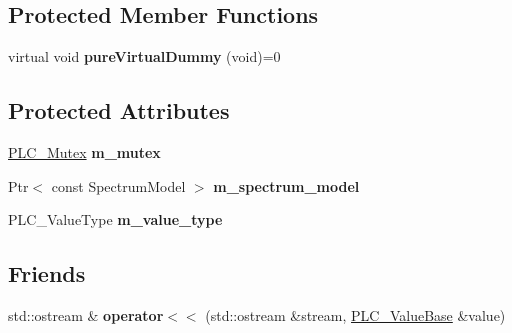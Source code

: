 \subsection*{\-Protected \-Member \-Functions}
\begin{DoxyCompactItemize}
\item 
\hypertarget{classns3_1_1PLC__ValueBase_ad4b3aa179236b9ef183f1b8b4ccf57d6}{virtual void {\bfseries pure\-Virtual\-Dummy} (void)=0}\label{classns3_1_1PLC__ValueBase_ad4b3aa179236b9ef183f1b8b4ccf57d6}

\end{DoxyCompactItemize}
\subsection*{\-Protected \-Attributes}
\begin{DoxyCompactItemize}
\item 
\hypertarget{classns3_1_1PLC__ValueBase_ada5e05a8498a3bf69e682404a15bfedb}{\hyperlink{structns3_1_1PLC__Mutex}{\-P\-L\-C\-\_\-\-Mutex} {\bfseries m\-\_\-mutex}}\label{classns3_1_1PLC__ValueBase_ada5e05a8498a3bf69e682404a15bfedb}

\item 
\hypertarget{classns3_1_1PLC__ValueBase_a3da12fe42a52936f4f72a1c635824ddd}{\-Ptr$<$ const \-Spectrum\-Model $>$ {\bfseries m\-\_\-spectrum\-\_\-model}}\label{classns3_1_1PLC__ValueBase_a3da12fe42a52936f4f72a1c635824ddd}

\item 
\hypertarget{classns3_1_1PLC__ValueBase_ae20150e2ae5678848c5961ebe4b6e9ab}{\-P\-L\-C\-\_\-\-Value\-Type {\bfseries m\-\_\-value\-\_\-type}}\label{classns3_1_1PLC__ValueBase_ae20150e2ae5678848c5961ebe4b6e9ab}

\end{DoxyCompactItemize}
\subsection*{\-Friends}
\begin{DoxyCompactItemize}
\item 
\hypertarget{classns3_1_1PLC__ValueBase_a2bf86fcf6c4f50fc8c925910881c7e37}{std\-::ostream \& {\bfseries operator$<$$<$} (std\-::ostream \&stream, \hyperlink{classns3_1_1PLC__ValueBase}{\-P\-L\-C\-\_\-\-Value\-Base} \&value)}\label{classns3_1_1PLC__ValueBase_a2bf86fcf6c4f50fc8c925910881c7e37}

\end{DoxyCompactItemize}


